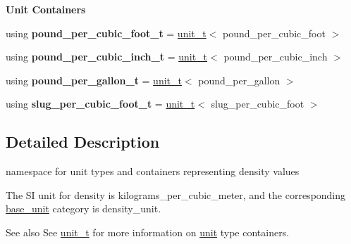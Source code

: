 \begin{Indent}{\bf Unit Containers}
\begin{DoxyCompactItemize}
\item 
\hypertarget{namespaceunits_1_1density_a0dd5dbc517a62964724134788660efd5}{}using {\bfseries pound\+\_\+per\+\_\+cubic\+\_\+foot\+\_\+t} = \hyperlink{classunits_1_1unit__t}{unit\+\_\+t}$<$ pound\+\_\+per\+\_\+cubic\+\_\+foot $>$\label{namespaceunits_1_1density_a0dd5dbc517a62964724134788660efd5}

\item 
\hypertarget{namespaceunits_1_1density_a2a6a2c18eae034eac666263cd1eaa5e1}{}using {\bfseries pound\+\_\+per\+\_\+cubic\+\_\+inch\+\_\+t} = \hyperlink{classunits_1_1unit__t}{unit\+\_\+t}$<$ pound\+\_\+per\+\_\+cubic\+\_\+inch $>$\label{namespaceunits_1_1density_a2a6a2c18eae034eac666263cd1eaa5e1}

\item 
\hypertarget{namespaceunits_1_1density_aedccb59a3617b9fe97287f1c802864a8}{}using {\bfseries pound\+\_\+per\+\_\+gallon\+\_\+t} = \hyperlink{classunits_1_1unit__t}{unit\+\_\+t}$<$ pound\+\_\+per\+\_\+gallon $>$\label{namespaceunits_1_1density_aedccb59a3617b9fe97287f1c802864a8}

\item 
\hypertarget{namespaceunits_1_1density_a18f4b461eece1adaae90cce1d88cf96b}{}using {\bfseries slug\+\_\+per\+\_\+cubic\+\_\+foot\+\_\+t} = \hyperlink{classunits_1_1unit__t}{unit\+\_\+t}$<$ slug\+\_\+per\+\_\+cubic\+\_\+foot $>$\label{namespaceunits_1_1density_a18f4b461eece1adaae90cce1d88cf96b}

\end{DoxyCompactItemize}
\end{Indent}


\subsection{Detailed Description}
namespace for unit types and containers representing density values 

The S\+I unit for density is {\ttfamily kilograms\+\_\+per\+\_\+cubic\+\_\+meter}, and the corresponding {\ttfamily \hyperlink{structunits_1_1base__unit}{base\+\_\+unit}} category is {\ttfamily density\+\_\+unit}. \begin{DoxySeeAlso}{See also}
See \hyperlink{classunits_1_1unit__t}{unit\+\_\+t} for more information on \hyperlink{structunits_1_1unit}{unit} type containers. 
\end{DoxySeeAlso}
